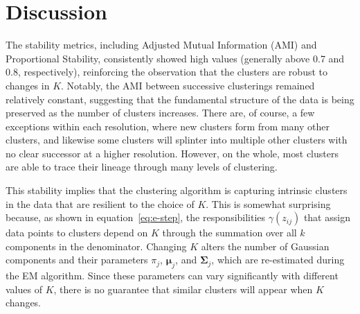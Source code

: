 \documentclass{article}
\begin{document}
\section{Discussion}
The stability metrics, including Adjusted Mutual Information (AMI) and Proportional Stability, consistently showed high values (generally above 0.7 and 0.8, respectively), reinforcing the observation that the clusters are robust to changes in $K$. Notably, the AMI between successive clusterings remained relatively constant, suggesting that the fundamental structure of the data is being preserved as the number of clusters increases. There are, of course, a few exceptions within each resolution, where new clusters form from many other clusters, and likewise some clusters will splinter into multiple other clusters with no clear successor at a higher resolution. However, on the whole, most clusters are able to trace their lineage through many levels of clustering.


This stability implies that the clustering algorithm is capturing intrinsic clusters in the data that are resilient to the choice of \(K\). This is somewhat surprising because, as shown in equation~\eqref{eq:e-step}, the responsibilities \(\gamma(z_{ij})\) that assign data points to clusters depend on \(K\) through the summation over all \(k\) components in the denominator. Changing \(K\) alters the number of Gaussian components and their parameters \(\pi_j\), \(\boldsymbol{\mu}_j\), and \(\boldsymbol{\Sigma}_j\), which are re-estimated during the EM algorithm. Since these parameters can vary significantly with different values of \(K\), there is no guarantee that similar clusters will appear when \(K\) changes.
\end{document}

